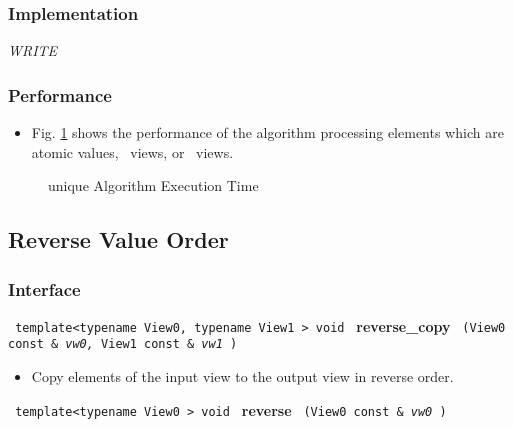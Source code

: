 \subsubsection{Implementation} %

\textit{WRITE}

\subsubsection{Performance} %

\begin{itemize}
\item
Fig. \ref{fig:unique-alg-exec-exper}
shows the performance of the algorithm processing
elements which are atomic values, \stl\ views, or \stapl\ views.
\end{itemize}

\begin{figure}[p]
\caption{unique Algorithm Execution Time}
\label{fig:unique-alg-exec-exper}
\end{figure}



\subsection{Reverse Value Order} \label{sec-reord-reverse}

\subsubsection{Interface} %

\noindent
\texttt{%
template<typename View0, typename View1 >
\newline
void 
}
\newline
\textbf{reverse\_copy}%
\texttt{%
(View0 const \&
\textit{vw0,}%
View1 const \&
\textit{vw1}%
)
}

\begin{itemize}
\item
Copy elements of the input view to the output view in reverse order. 
\end{itemize}
 
\noindent
\texttt{%
template<typename View0 >
\newline
void 
}
\newline
\textbf{reverse}%
\texttt{%
(View0 const \&
\textit{vw0}%
)
}

